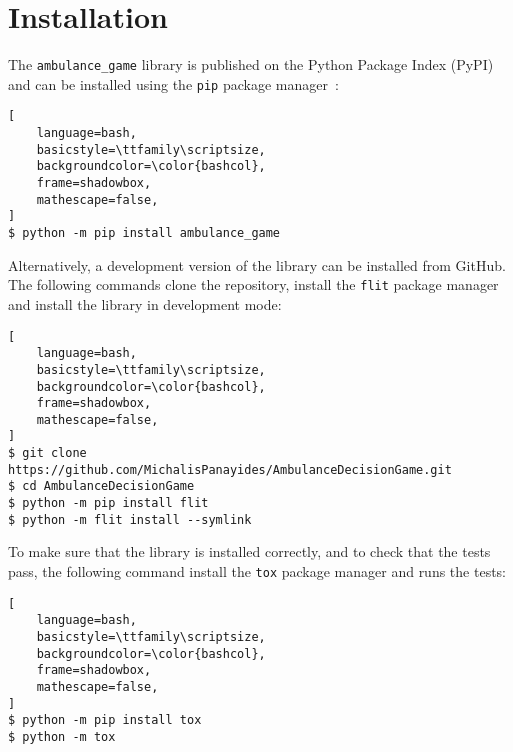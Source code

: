 \section{Installation}\label{sec:ambulance_game_installation}

The \texttt{ambulance\_game} library is published on the Python Package
Index (PyPI)
and can be installed using the \texttt{pip} package manager~\cite{pypi}:

\begin{lstlisting}[
    language=bash,
    basicstyle=\ttfamily\scriptsize,
    backgroundcolor=\color{bashcol},
    frame=shadowbox,
    mathescape=false,
]
$ python -m pip install ambulance_game
\end{lstlisting}

Alternatively, a development version of the library can be installed from
GitHub.
The following commands clone the repository, install the \texttt{flit}
package manager and install the library in development mode: 

\begin{lstlisting}[
    language=bash,
    basicstyle=\ttfamily\scriptsize,
    backgroundcolor=\color{bashcol},
    frame=shadowbox,
    mathescape=false,
]
$ git clone https://github.com/MichalisPanayides/AmbulanceDecisionGame.git
$ cd AmbulanceDecisionGame
$ python -m pip install flit
$ python -m flit install --symlink
\end{lstlisting}

To make sure that the library is installed correctly, and to check that the
tests pass, the following command install the \texttt{tox} package manager
and runs the tests:

\begin{lstlisting}[
    language=bash,
    basicstyle=\ttfamily\scriptsize,
    backgroundcolor=\color{bashcol},
    frame=shadowbox,
    mathescape=false,
]
$ python -m pip install tox
$ python -m tox
\end{lstlisting}
